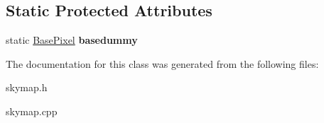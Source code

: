 \subsection*{Static Protected Attributes}
\begin{DoxyCompactItemize}
\item 
\hypertarget{classSkymap_a7085d8df86f1e3938132360260c9f86b}{
static \hyperlink{classBasePixel}{BasePixel} {\bfseries basedummy}}
\label{classSkymap_a7085d8df86f1e3938132360260c9f86b}

\end{DoxyCompactItemize}


The documentation for this class was generated from the following files:\begin{DoxyCompactItemize}
\item 
skymap.h\item 
skymap.cpp\end{DoxyCompactItemize}

